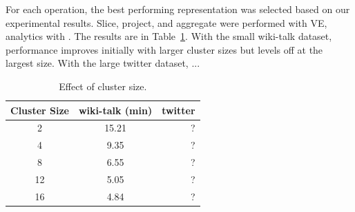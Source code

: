 For each operation, the best performing representation was selected
based on our experimental results.  Slice, project, and aggregate were
performed with VE, analytics with \hg.  The results are in
Table~\ref{tab:clustersize}.  With the small wiki-talk dataset,
performance improves initially with larger cluster sizes but levels
off at the largest size.  With the large twitter dataset, ...

\begin{table}
\centering
\caption{Effect of cluster size.}
\vspace{-0.1in}
\small
\begin{tabular}{| c | c | r |}
\hline
\multicolumn{1}{|c|}{\bfseries Cluster Size} & \multicolumn{1}{c|}{\bfseries wiki-talk (min)} & \multicolumn{1}{r|}{\bfseries twitter} \\ \hline
2 & 15.21 & ? \\ \hline
4 & 9.35 & ? \\ \hline
8 & 6.55 & ? \\ \hline
12 & 5.05 & ? \\ \hline
16 & 4.84 & ? \\ \hline
\end{tabular}
\label{tab:clustersize}
\end{table}

